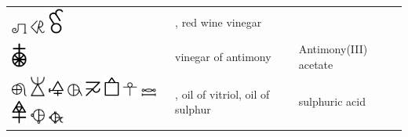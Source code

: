 \documentclass[british,final,landscape]{scrartcl}
\begin{document}
\begin{refsection}
\begin{supertabular}{p{0.3\textwidth}p{0.34\textwidth}p{0.34\textwidth}}
   \includegraphics[width=5mm]{Compounds/RedWineVinegar} \includegraphics[width=5mm]{Compounds/RedWineVinegar2} \includegraphics[width=5mm]{Compounds/RedWineVinegar3} & , red wine vinegar & \\
   \includegraphics[width=5mm]{Compounds/VinegarOfAntimony} & vinegar of antimony & Antimony(III) acetate  \\
   \includegraphics[width=5mm]{Compounds/Vitriol} \includegraphics[width=5mm]{Compounds/Vitriol2} \includegraphics[width=5mm]{Compounds/Vitriol3} \includegraphics[width=5mm]{Compounds/Vitriol4} \includegraphics[width=5mm]{Compounds/Vitriol5} \includegraphics[width=5mm]{Compounds/Vitriol6} \includegraphics[width=5mm]{Compounds/Vitriol7} \includegraphics[width=5mm]{Compounds/Vitriol8} \includegraphics[width=5mm]{Compounds/Vitriol9} \includegraphics[width=5mm]{Compounds/Vitriol10} \includegraphics[width=5mm]{Compounds/Vitriol11} & , oil of vitriol, oil of sulphur & sulphuric acid  \\

\end{supertabular}
\end{refsection}
\end{document}
